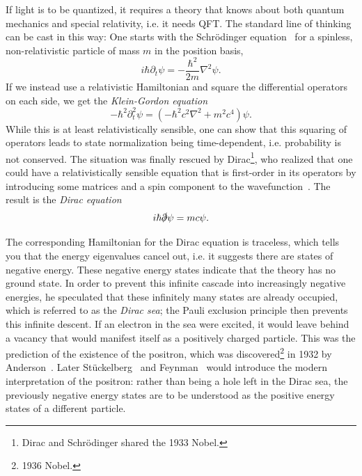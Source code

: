 If light is to be quantized, it requires a theory that knows about both quantum
mechanics and special relativity, i.e. it needs QFT. 
The standard line of thinking can be cast in this way: One starts with
the Schr\"odinger 
equation~\cite{Schrodinger:1926gei,Schrodinger:1926vbi,Schrodinger:1926qnk,Schrodinger:1926xyk}
for a spinless, non-relativistic particle
of mass $m$ in the position basis,
\begin{equation}
i\hbar\partial_t\psi=-\frac{\hbar^2}{2m}\nabla^2\psi.
\end{equation}
If we instead use a relativistic Hamiltonian and square the differential
operators on each side, we get the 
{\it Klein-Gordon equation}~\cite{Klein:1926tv,gordon_comptoneffekt_1926}
\begin{equation}
-\hbar^2\partial_t^2\psi=\left(-\hbar^2c^2\nabla^2+m^2c^4\right)\psi.
\end{equation} 
While this is at least relativistically sensible, one can show that this
squaring of operators
leads to state normalization being time-dependent, i.e. probability is not
conserved. The situation was finally rescued by Dirac\footnote{Dirac
and Schr\"odinger shared the 1933 Nobel.}, who realized that
one could have a relativistically sensible equation that is first-order
in its operators by introducing some matrices and a spin component
to the wavefunction~\cite{Dirac:1928hu,Dirac:1928ej}. The result is the 
{\it Dirac equation}
\begin{equation}
i\hbar\slashed{\partial}\psi=mc\psi.
\end{equation}

The corresponding Hamiltonian for the Dirac equation is traceless, which
tells you that the energy eigenvalues cancel out, i.e. 
it suggests there are states of
negative energy. These negative energy states indicate that the theory
has no ground state. In order to prevent this infinite cascade into increasingly
negative energies, he speculated that these infinitely many states are already
occupied, which is referred to as the {\it Dirac sea}; 
the Pauli exclusion principle then prevents this infinite descent. 
If an electron in the sea were excited, it would leave behind a vacancy
that would manifest itself as a positively charged particle. This was the
prediction of the existence of the positron, which
was discovered\footnote{1936 Nobel.} in 1932 by Anderson~\cite{Anderson:1933mb}.
Later St\"uckelberg~\cite{Stueckelberg:1941rg} and
Feynman~\cite{feynman_theory_1949} would introduce the modern interpretation
of the positron: rather than being a hole left in the Dirac sea,
the previously negative energy states are to be understood as the
positive energy states of a different particle.


